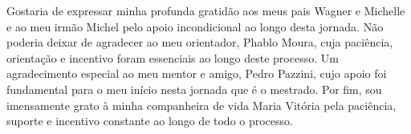 Gostaria de expressar minha profunda gratidão aos meus pais Wagner e Michelle e ao meu irmão Michel pelo apoio incondicional ao longo desta jornada. Não poderia deixar de agradecer ao meu orientador, Phablo Moura, cuja paciência, orientação e incentivo foram essenciais ao longo deste processo. Um agradecimento especial ao meu mentor e amigo, Pedro Pazzini, cujo apoio foi fundamental para o meu início nesta jornada que é o mestrado. Por fim, sou imensamente grato à minha companheira de vida Maria Vitória pela paciência, suporte e incentivo constante ao longo de todo o processo.
